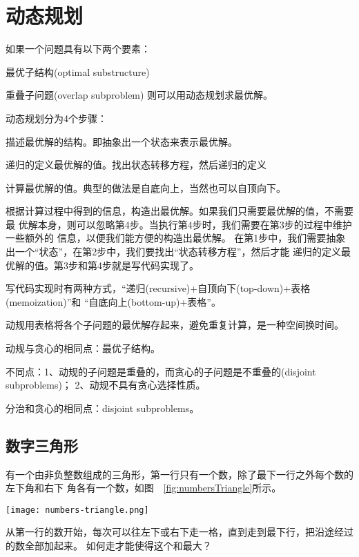 \chapter{动态规划}
如果一个问题具有以下两个要素：
\begindot
\item 最优子结构(optimal substructure)
\item 重叠子问题(overlap subproblem)
\myenddot
则可以用动态规划求最优解。

动态规划分为4个步骤：
\begindot
\item 描述最优解的结构。即抽象出一个状态来表示最优解。
\item 递归的定义最优解的值。找出状态转移方程，然后递归的定义
\item 计算最优解的值。典型的做法是自底向上，当然也可以自顶向下。
\item 根据计算过程中得到的信息，构造出最优解。如果我们只需要最优解的值，不需要最
优解本身，则可以忽略第4步。当执行第4步时，我们需要在第3步的过程中维护一些额外的
信息，以便我们能方便的构造出最优解。
\myenddot
在第1步中，我们需要抽象出一个“状态”，在第2步中，我们要找出“状态转移方程”，然后才能
递归的定义最优解的值。第3步和第4步就是写代码实现了。

写代码实现时有两种方式，“递归(recursive)+自顶向下(top-down)+表格(memoization)”和
“自底向上(bottom-up)+表格”。

动规用表格将各个子问题的最优解存起来，避免重复计算，是一种空间换时间。

动规与贪心的相同点：最优子结构。

不同点：1、动规的子问题是重叠的，而贪心的子问题是不重叠的(disjoint subproblems)；
2、动规不具有贪心选择性质。

分治和贪心的相同点：disjoint subproblems。

\section{数字三角形} %
有一个由非负整数组成的三角形，第一行只有一个数，除了最下一行之外每个数的左下角和右下
角各有一个数，如图~~\ref{fig:numbersTriangle}所示。

\begin{center}
\texttt{[image: numbers-triangle.png]}\\
\label{fig:numbersTriangle}
\end{center}

从第一行的数开始，每次可以往左下或右下走一格，直到走到最下行，把沿途经过的数全部加起来。
如何走才能使得这个和最大？

